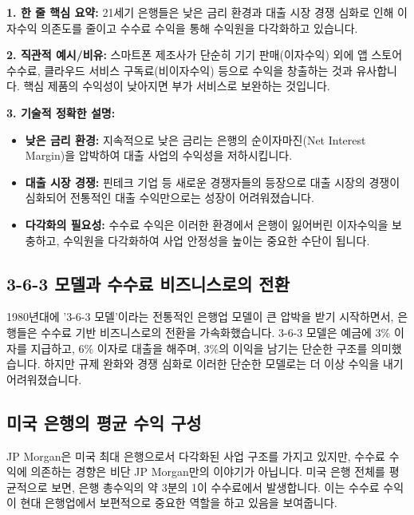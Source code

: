 \documentclass[11pt,a4paper]{article}
\theoremstyle{definition}
\begin{document}
\begin{summarybox}[title={수수료 수익 증가의 배경}]
\textbf{1. 한 줄 핵심 요약:} 21세기 은행들은 낮은 금리 환경과 대출 시장 경쟁 심화로 인해 이자수익 의존도를 줄이고 수수료 수익을 통해 수익원을 다각화하고 있습니다.

\textbf{2. 직관적 예시/비유:} 스마트폰 제조사가 단순히 기기 판매(이자수익) 외에 앱 스토어 수수료, 클라우드 서비스 구독료(비이자수익) 등으로 수익을 창출하는 것과 유사합니다. 핵심 제품의 수익성이 낮아지면 부가 서비스로 보완하는 것입니다.

\textbf{3. 기술적 정확한 설명:}
\begin{itemize}
    \item \textbf{낮은 금리 환경:} 지속적으로 낮은 금리는 은행의 순이자마진(Net Interest Margin)을 압박하여 대출 사업의 수익성을 저하시킵니다.
    \item \textbf{대출 시장 경쟁:} 핀테크 기업 등 새로운 경쟁자들의 등장으로 대출 시장의 경쟁이 심화되어 전통적인 대출 수익만으로는 성장이 어려워졌습니다.
    \item \textbf{다각화의 필요성:} 수수료 수익은 이러한 환경에서 은행이 잃어버린 이자수익을 보충하고, 수익원을 다각화하여 사업 안정성을 높이는 중요한 수단이 됩니다.
\end{itemize}
\end{summarybox}

\subsection{3-6-3 모델과 수수료 비즈니스로의 전환}

1980년대에 '3-6-3 모델'이라는 전통적인 은행업 모델이 큰 압박을 받기 시작하면서, 은행들은 수수료 기반 비즈니스로의 전환을 가속화했습니다. 3-6-3 모델은 예금에 3\% 이자를 지급하고, 6\% 이자로 대출을 해주며, 3\%의 이익을 남기는 단순한 구조를 의미했습니다. 하지만 규제 완화와 경쟁 심화로 이러한 단순한 모델로는 더 이상 수익을 내기 어려워졌습니다.

\subsection{미국 은행의 평균 수익 구성}

JP Morgan은 미국 최대 은행으로서 다각화된 사업 구조를 가지고 있지만, 수수료 수익에 의존하는 경향은 비단 JP Morgan만의 이야기가 아닙니다. 미국 은행 전체를 평균적으로 보면, 은행 총수익의 약 3분의 1이 수수료에서 발생합니다. 이는 수수료 수익이 현대 은행업에서 보편적으로 중요한 역할을 하고 있음을 보여줍니다.
\end{document}
